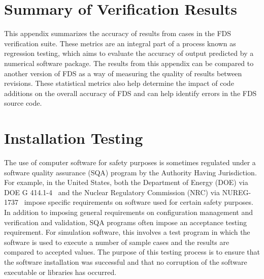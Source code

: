 \documentclass[11pt]{book}
\begin{document}
\clearpage




\newpage



\newpage

\appendix

\chapter{Summary of Verification Results}
\label{info:verification_statistics}

This appendix summarizes the accuracy of results from cases in the FDS verification suite. These metrics are an integral part of a process known as regression testing, which aims to evaluate the accuracy of output predicted by a numerical software package. The results from this appendix can be compared to another version of FDS as a way of measuring the quality of results between revisions. These statistical metrics also help determine the impact of code additions on the overall accuracy of FDS and can help identify errors in the FDS source code.


\newpage

\chapter{Installation Testing}
\label{info:installation_testing}

The use of computer software for safety purposes is sometimes regulated under a software quality assurance (SQA) program by the Authority Having Jurisdiction.  For example, in the United States, both the Department of Energy (DOE) via DOE G 414.1-4~\cite{DOE_G_414} and the Nuclear Regulatory Commission (NRC) via NUREG-1737~\cite{NUREG_1737} impose specific requirements on software used for certain safety purposes.  In addition to imposing general requirements on configuration management and verification and validation, SQA programs often impose an acceptance testing requirement.  For simulation software, this involves a test program in which the software is used to execute a number of sample cases and the results are compared to accepted values.  The purpose of this testing process is to ensure that the software installation was successful and that no corruption of the software executable or libraries has occurred.
\end{document}
